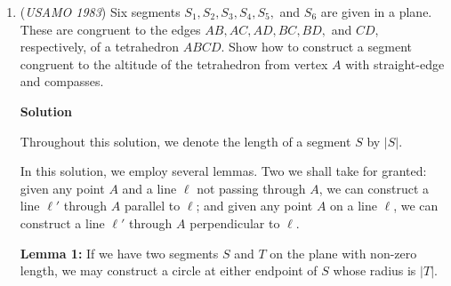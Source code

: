 \begin{enumerate}
 



\textbf{Solution}

Let us first see that this works for anything less than three sets.

 Obviously, due to the second condition given, they all share at least one point in common.

 Now, let us see that it works for three or more sets.

 First, take any three of the subsets in the family of sets.

 Let them be A, B, and C. We know that they share at least one point in common. Let us take the pair of segments that have the shortest length when you take the union of the pair. Let us denote this segment D. Evidently, if you take any other set of points, it must intersect D at least at one point. In order to minimize the number of intersections between the other varying segments, we must have at close to 1/2 of the remaining segments as possible intersecting each other. However, if we note, putting them that way forces at least 1/2 of the segments in each section.

 


	\item (\textit{USAMO 1983}) Six segments $S_1, S_2, S_3, S_4, S_5,$ and $S_6$ are given in a plane. These are congruent to the edges $AB, AC, AD, BC, BD,$ and $CD$, respectively, of a tetrahedron $ABCD$. Show how to construct a segment congruent to the altitude of the tetrahedron from vertex $A$ with straight-edge and compasses.


 



\textbf{Solution}

Throughout this solution, we denote the length of a segment $S$ by $|S|$.

 In this solution, we employ several lemmas. Two we shall take for granted: given any point $A$ and a line $\ell$ not passing through $A$, we can construct a line $\ell'$ through $A$ parallel to $\ell$; and given any point $A$ on a line $\ell$, we can construct a line $\ell'$ through $A$ perpendicular to $\ell$.

 \textbf{Lemma 1:} If we have two segments $S$ and $T$ on the plane with non-zero length, we may construct a circle at either endpoint of $S$ whose radius is $|T|$.


\end{enumerate}
